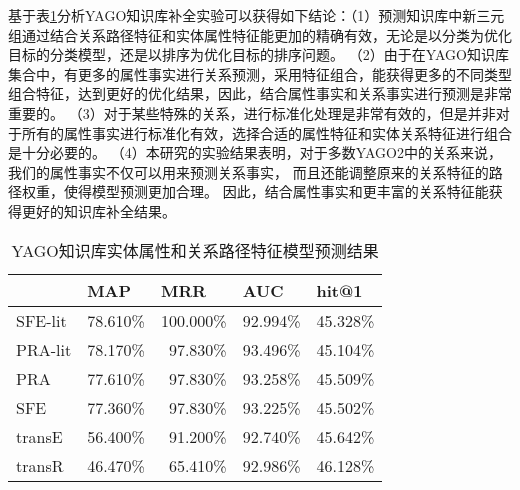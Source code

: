 基于表\ref{tab:kbc-yago-literal}分析YAGO知识库补全实验可以获得如下结论：（1）预测知识库中新三元组通过结合关系路径特征和实体属性特征能更加的精确有效，无论是以分类为优化目标的分类模型，还是以排序为优化目标的排序问题。
（2）由于在YAGO知识库集合中，有更多的属性事实进行关系预测，采用特征组合，能获得更多的不同类型组合特征，达到更好的优化结果，因此，结合属性事实和关系事实进行预测是非常重要的。
（3）对于某些特殊的关系，进行标准化处理是非常有效的，但是并非对于所有的属性事实进行标准化有效，选择合适的属性特征和实体关系特征进行组合是十分必要的。
（4）本研究的实验结果表明，对于多数YAGO2中的关系来说，我们的属性事实不仅可以用来预测关系事实，
而且还能调整原来的关系特征的路径权重，使得模型预测更加合理。
因此，结合属性事实和更丰富的关系特征能获得更好的知识库补全结果。
\begin{table}[htbp]
  \centering
  \caption{YAGO知识库实体属性和关系路径特征模型预测结果}
    \begin{tabular}{|l|r|r|r|r|}
    \hline
          & \multicolumn{1}{l|}{MAP} & \multicolumn{1}{l|}{MRR} & \multicolumn{1}{l|}{AUC} & \multicolumn{1}{l|}{hit@1} \\
    \hline
    SFE-lit & 78.610\% & 100.000\% & 92.994\% & 45.328\% \\
    \hline
    PRA-lit & 78.170\% & 97.830\% & 93.496\% & 45.104\% \\
    \hline
    PRA   & 77.610\% & 97.830\% & 93.258\% & 45.509\% \\
    \hline
    SFE   & 77.360\% & 97.830\% & 93.225\% & 45.502\% \\
    \hline
    transE & 56.400\% & 91.200\% & 92.740\% & 45.642\% \\
    \hline
    transR & 46.470\% & 65.410\% & 92.986\% & 46.128\% \\
    \hline
    \end{tabular}%
  \label{tab:kbc-yago-literal}%
\end{table}%


